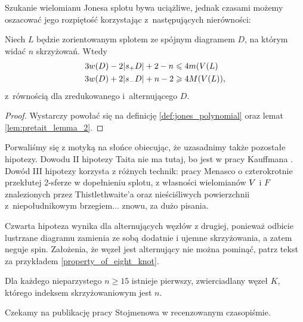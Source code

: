 Szukanie wielomianu Jonesa splotu bywa uciążliwe,
jednak czasami możemy oszacować jego rozpiętość korzystając z~następujących nierówności:

\begin{corollary}
    Niech $L$ będzie zorientowanym splotem ze spójnym diagramem $D$, na którym widać $n$ skrzyżowań.
    Wtedy
    \begin{align}
        3w(D) - 2|s_+D| + 2 - n & \leqslant 4 m(V(L) \\
        3w(D) + 2|s_-D| + n - 2 & \geqslant 4 M(V(L)),
    \end{align}
    z~równością dla zredukowanego i~alternującego $D$.
\end{corollary}

\begin{proof}
    Wystarczy powołać się na definicję \ref{def:jones_polynomial} oraz lemat \ref{lem:pretait_lemma_2}.
\end{proof}

Porwaliśmy się z motyką na słońce obiecując, że uzasadnimy także pozostałe hipotezy.
Dowodu II hipotezy Taita nie ma tutaj, bo jest w pracy Kauffmana \cite{kauffman1987}.
Dowód III hipotezy korzysta z różnych technik: pracy Menasco o czterokrotnie przekłutej 2-sferze w dopełnieniu splotu, z własności wielomianów $V$ i $F$ znalezionych przez Thistlethwaite'a oraz nieściśliwych powierzchnii z~niepołudnikowym brzegiem... znowu, za dużo pisania.

Czwarta hipoteza wynika dla alternujących węzłów z drugiej, ponieważ odbicie lustrzane diagramu zamienia ze sobą dodatnie i ujemne skrzyżowania, a zatem neguje spin.
Założenia, że węzeł jest alternujący nie można pominąć, patrz tekst za przykładem \ref{property_of_eight_knot}.

\begin{proposition}
    Dla każdego nieparzystego $n \ge 15$ istnieje pierwszy, zwierciadlany węzeł $K$, którego indeksem skrzyżowaniowym jest $n$.
\end{proposition}

Czekamy na publikację pracy Stojmenowa \cite{stoimenow2007} w recenzowanym czasopiśmie.

%


